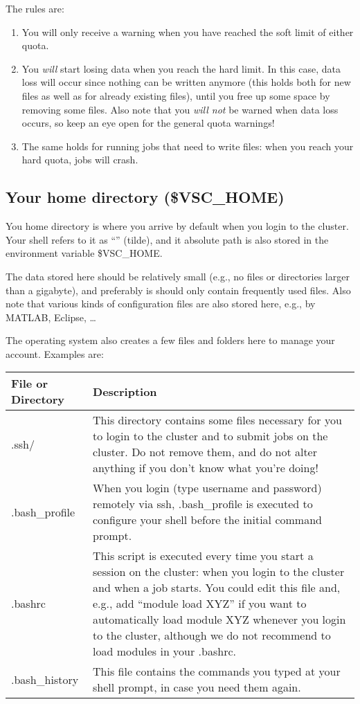The rules are:
\begin{enumerate}
\item  You will only receive a warning when you have reached the soft limit of either quota.
\item  You \emph{will} start losing data when you reach the hard limit. In this
  case, data loss will occur  since nothing can be written anymore (this holds
  both for new files as well as for already existing files), until you free up
  some space by removing some files. Also note that you \emph{will not} be
  warned when data loss occurs, so keep an eye open for the general quota
  warnings!
\item  The same holds for running jobs that need to write files: when you reach
  your hard quota, jobs will crash.
\end{enumerate}

\subsection{Your home directory (\$VSC\_HOME)}

You home directory is where you arrive by default when you login to the
cluster. Your shell refers to it as ``\tilde'' (tilde), and it absolute path is also
stored in the environment variable \$VSC\_HOME.

The data stored here should be relatively small (e.g., no files or directories
larger than a gigabyte), and preferably is should only contain frequently used
files. Also note that various kinds of configuration files are also stored
here, e.g., by MATLAB, Eclipse, \ldots

The operating system also creates a few files and folders here to manage your
account. Examples are:

\begin{tabular}{|p{}|p{}|} \hline
\textbf{File or Directory} & \textbf{Description} \\ \hline
.ssh/                      & This directory contains some files necessary for you to login to the cluster and to submit jobs on the cluster. Do not remove them, and do not alter anything if you don't know what you're doing! \\ \hline
.bash\_profile             & When you login (type username and password) remotely via ssh, .bash\_profile is executed to configure your shell before the initial command prompt. \\ \hline
.bashrc                    & This script is executed every time you start a session on the cluster: when you login to the cluster and when a job starts. You could edit this file and, e.g., add ``module load XYZ'' if you want to automatically load module XYZ whenever you login to the cluster, although we do not recommend to load modules in your .bashrc. \\ \hline
.bash\_history             & This file contains the commands you typed at your shell prompt, in case you need them again. \\ \hline
\end{tabular}

